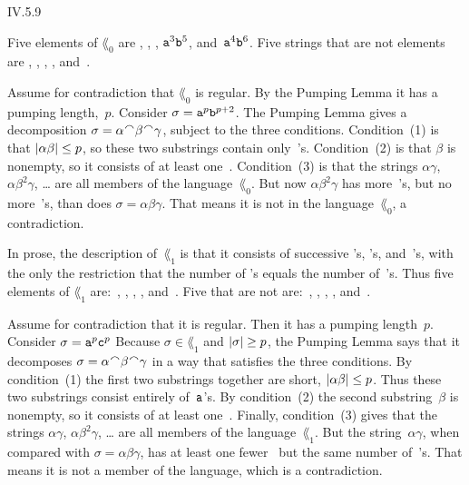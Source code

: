 \begin{ans}{IV.5.9}
\begin{exparts}
\item Five elements of $\lang_0$ are , , ,
$\texttt{a}^3\texttt{b}^5$, and~$\texttt{a}^4\texttt{b}^6$.
Five strings that are not elements are
\emptystring, , , , and~.

Assume for contradiction that $\lang_0$ is regular.
By the Pumping Lemma it has a pumping length,~$p$.
Consider $\sigma=\texttt{a}^p\texttt{b}^{p+2}$.
The Pumping Lemma gives a decomposition
$\sigma=\alpha\concat\beta\concat\gamma$, subject to the three conditions.
Condition~(1) is that $|\alpha\beta|\leq p$, so these two substrings
contain only~'s.
Condition~(2) is that $\beta$ is nonempty, so it consists of at least
one~.
Condition~(3) is that the strings
$\alpha\gamma$, $\alpha\beta^2\gamma$, \ldots{} are all members of
the language~$\lang_0$.
But now $\alpha\beta^2\gamma$ has more~'s, but no more~'s,
than does $\sigma=\alpha\beta\gamma$.
That means it is not in the language~$\lang_0$, a contradiction.

\item In prose, the description of~$\lang_1$ is that it consists of
successive 's, 's, and~'s,
with the only the restriction that the number of
's equals the number of~'s.
Thus five elements of $\lang_1$ are:~\emptystring,
, , , and~.
Five that are not are:~, , , , and~.

Assume for contradiction that it is regular.
Then it has a pumping length~$p$.
Consider $\sigma=\texttt{a}^p\texttt{c}^p$
Because $\sigma\in\lang_1$ and $|\sigma|\geq p$, the Pumping Lemma
says that it decomposes $\sigma=\alpha\concat\beta\concat\gamma$
in a way that satisfies the three conditions.
By condition~(1) the first two substrings together are short,
$|\alpha\beta|\leq p$.
Thus these two substrings consist entirely of~$\texttt{a}$'s.
By condition~(2) the second substring~$\beta$ is nonempty,
so it consists of at least one~.
Finally, condition~(3) gives that the strings
$\alpha\gamma$, $\alpha\beta^2\gamma$, \ldots{} are all members of
the language~$\lang_1$.
But the string~$\alpha\gamma$, when compared with $\sigma=\alpha\beta\gamma$,
has at least one fewer~ but the same number of~'s.
That means it is not a member of the language, which is a contradiction.


\end{exparts}
\end{ans}

